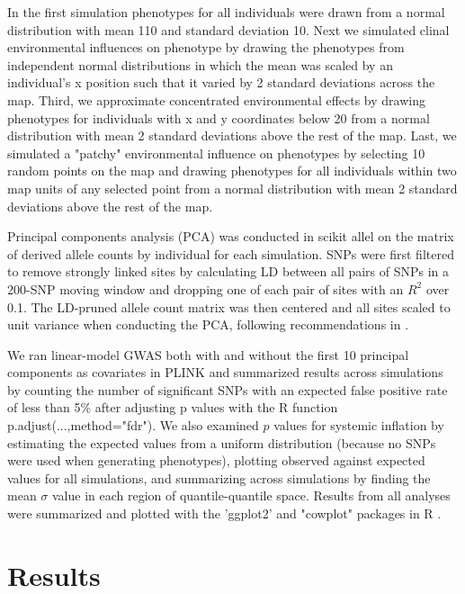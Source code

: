 \documentclass[10pt,twoside,lineno]{gsajnl}
\newif\ifcomments
\newcommand{\ak}[1]{\ifcomments{{\color{red} \it (#1)}}\else{}\fi}
\begin{document}
In the first simulation phenotypes for all individuals were drawn from a normal distribution with mean 110 and standard deviation 10. Next we simulated clinal environmental influences on phenotype by drawing the phenotypes from independent normal distributions in which the mean was scaled by an individual's x position such that it varied by 2 standard deviations across the map. Third, we approximate concentrated environmental effects by drawing phenotypes for individuals with x and y coordinates below 20 from a normal distribution with mean 2 standard deviations above the rest of the map. Last, we simulated a "patchy" environmental influence on phenotypes by selecting 10 random points on the map and drawing phenotypes for all individuals within two map units of any selected point from a normal distribution with mean 2 standard deviations above the rest of the map. \ak{in addition to the verbal treatment above I would list the formulae that you are using for the phenotypes here}

Principal components analysis (PCA) was conducted in scikit allel on the matrix of derived allele counts by individual for each simulation. SNPs were first filtered to remove strongly linked sites by calculating LD between all pairs of SNPs in a 200-SNP moving window and dropping one of each pair of sites with an $R^2$ over 0.1. The LD-pruned allele count matrix was then centered and all sites scaled to unit variance when conducting the PCA, following recommendations in \citep{Patterson2006}.   

We ran linear-model GWAS both with and without the first 10 principal components as covariates in PLINK and summarized results across simulations by counting the number of significant SNPs with an expected false positive rate of less than 5\% after adjusting p values with the R function p.adjust(...,method="fdr"). We also examined $p$ values for systemic inflation by estimating the expected values from a uniform distribution (because no SNPs were used when generating phenotypes), plotting observed against expected values for all simulations, and summarizing across simulations by finding the mean $\sigma$ value in each region of quantile-quantile space. Results from all analyses were summarized and plotted with the 'ggplot2' \citep{Wickham2016} and "cowplot" \citep{Wilke2019} packages in R \citep{Rcore2018}. 

\section{Results}
\end{document}
